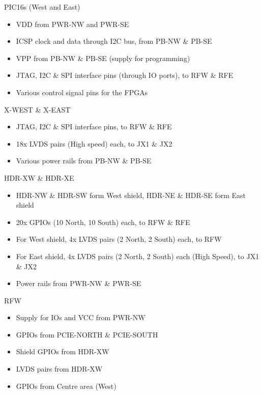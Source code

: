 \documentclass{beamer}
\begin{document}
\begin{frame}{PIC16s (West and East)}
    \begin{itemize}
    \item VDD from PWR-NW and PWR-SE
    \item ICSP clock and data through I2C bus, from PB-NW \& PB-SE
    \item VPP from PB-NW \& PB-SE (supply for programming)
    \item JTAG, I2C \& SPI interface pins (through IO ports), to RFW \& RFE
    \item Various control signal pins for the FPGAs
    \end{itemize}
\end{frame}

\begin{frame}{X-WEST \& X-EAST}
    \begin{itemize}
    \item JTAG, I2C \& SPI interface pins, to RFW \& RFE
    \item 18x LVDS pairs (High speed) each, to JX1 \& JX2
    \item Various power rails from PB-NW \& PB-SE
    \end{itemize}
\end{frame}

\begin{frame}{HDR-XW \& HDR-XE}
    \begin{itemize}
    \item HDR-NW \& HDR-SW form West shield, HDR-NE \& HDR-SE form East shield
    \item 20x GPIOs (10 North, 10 South) each, to RFW \& RFE 
    \item For West shield, 4x LVDS pairs (2 North, 2 South) each, to RFW 
    \item For East shield, 4x LVDS pairs (2 North, 2 South) each (High Speed), to JX1 \& JX2
    \item Power rails from PWR-NW \& PWR-SE
    \end{itemize}
\end{frame}

\begin{frame}{RFW}
    \begin{itemize}
    \item Supply for IOs and VCC from PWR-NW
    \item GPIOs from PCIE-NORTH \& PCIE-SOUTH
    \item Shield GPIOs from HDR-XW 
    \item LVDS pairs from HDR-XW
    \item GPIOs from Centre area (West)  
    \end{itemize}
\end{frame}
\end{document}
